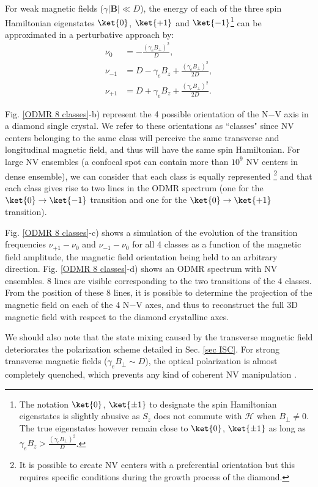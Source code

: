 \documentclass[a4paper, 11pt]{report}
\begin{document}
For weak magnetic fields ($\gamma |\textbf{B}| \ll D$), the energy of each of the three spin Hamiltonian eigenstates $\ket{0}$, $\ket{+1}$ and $\ket{-1}$\footnote{The notation $\ket{0}$, $\ket{\pm 1}$ to designate the spin Hamiltonian eigenstates is slightly abusive as $S_z$ does not commute with $\mathcal{H}$ when $B_\perp \neq 0$. The true eigenstates however remain close to $\ket{0}$, $\ket{\pm 1}$ as long as $\gamma_e B_z > \frac{(\gamma_e B_\perp)^2}{D}$.} can be approximated in a perturbative approach by: %
\begin{align}
\nu_0&= -\frac{(\gamma_e B_\perp)^2}{D}, \nonumber \\
\nu_{-1} &= D - \gamma_e B_z + \frac{(\gamma_e B_\perp)^2}{2D}, \nonumber \\
\nu_{+1} &= D + \gamma_e B_z + \frac{(\gamma_e B_\perp)^2}{2D}.
\end{align}

Fig. \ref{ODMR 8 classes}-b) represent the 4 possible orientation of the N$-$V axis in a diamond single crystal. We refer to these orientations as ``classes" since NV centers belonging to the same class will perceive the same transverse and longitudinal magnetic field, and thus will have the same spin Hamiltonian. For large NV ensembles (a confocal spot can contain more than $10^9$ NV centers in dense ensemble), we can consider that each class is equally represented \footnote{It is possible to create NV centers with a preferential orientation \citep{lesik2014perfect} but this requires specific conditions during the growth process of the diamond.} and that each class gives rise to two lines in the ODMR spectrum (one for the $\ket{0} \to \ket{-1}$ transition and one for the $\ket{0} \to \ket{+1}$ transition). 

Fig. \ref{ODMR 8 classes}-c) shows a simulation of the evolution of the transition frequencies $\nu_{+1} - \nu_{0}$ and $\nu_{-1} - \nu_{0}$ for all 4 classes as a function of the magnetic field amplitude, the magnetic field orientation being held to an arbitrary direction. Fig. \ref{ODMR 8 classes}-d) shows an ODMR spectrum with NV ensembles. 8 lines are visible corresponding to the two transitions of the 4 classes. From the position of these 8 lines, it is possible to determine the projection of the magnetic field on each of the 4 N$-$V axes, and thus to reconstruct the full 3D magnetic field with respect to the diamond crystalline axes.

We should also note that the state mixing caused by the transverse magnetic field deteriorates the polarization scheme detailed in Sec. \ref{sec ISC}. For strong transverse magnetic fields ($\gamma_e B_\perp \sim D$), the optical polarization is almost completely quenched, which prevents any kind of coherent NV manipulation \citep{tetienne2012magnetic}.
\end{document}
